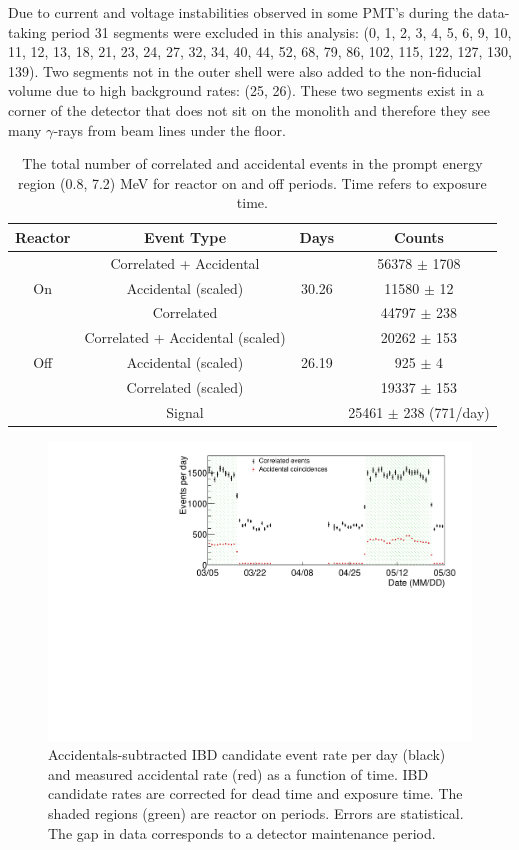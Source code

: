 Due to current and voltage instabilities observed in some PMT's during the data-taking period 31 segments were excluded in this analysis: (0, 1, 2, 3, 4, 5, 6, 9, 10, 11, 12, 13, 18, 21, 23, 24, 27, 32, 34, 40, 44, 52, 68, 79, 86, 102, 115, 122, 127, 130, 139).
Two segments not in the outer shell were also added to the non-fiducial volume due to high background rates: (25, 26).
These two segments exist in a corner of the detector that does not sit on the monolith and therefore they see many $\gamma$-rays from beam lines under the floor.

\begin{table}[H]
\begin{tabular}{|c|c|c|c|}
	\hline 
	\textbf{Reactor} & \textbf{Event Type} & \textbf{Days} & \textbf{Counts} \\ 
	\hline 
	& Correlated + Accidental &  & 56378 $\pm$ 1708 \\ 
	On & Accidental (scaled) & 30.26 & 11580 $\pm$ 12 \\ 
	& Correlated &  & 44797 $\pm$ 238 \\ 
	\hline 
	& Correlated + Accidental (scaled) & & 20262 $\pm$ 153   \\ 
	Off &  Accidental (scaled) & 26.19  & 925 $\pm$ 4   \\ 
	& Correlated (scaled) & & 19337 $\pm$ 153 \\ 
	\hline 
	\hline 
	& Signal &  & 25461 $\pm$ 238 (771/day) \\ 
	\hline 
\end{tabular} 
\caption{The total number of correlated and accidental events in the prompt energy region (0.8, 7.2) MeV for reactor on and off periods. Time refers to exposure time.}
\label{tab:datastats}
\end{table}

\begin{figure}[H]
	\centering
	\includegraphics[width=0.9\linewidth]{tex/7-oscillation-images/EvtRates}
	\caption{Accidentals-subtracted IBD candidate event rate per day (black) and measured accidental rate (red) as a function of time. IBD candidate rates are corrected for dead time and exposure time. The shaded regions (green) are reactor on periods. Errors are statistical. The gap in data corresponds to a detector maintenance period.}
	\label{fig:evtrates}
\end{figure}


